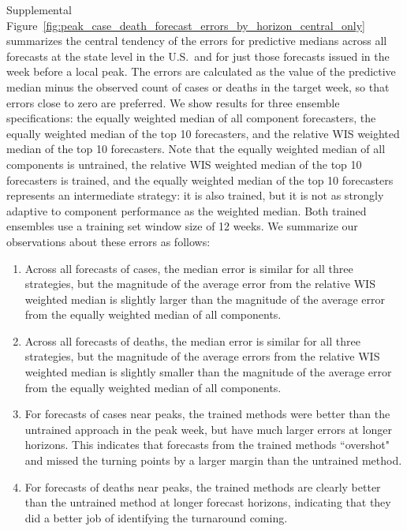 \documentclass{article}
\begin{document}
Supplemental Figure~\ref{fig:peak_case_death_forecast_errors_by_horizon_central_only} summarizes the central tendency of the errors for predictive medians across all forecasts at the state level in the U.S.\ and for just those forecasts issued in the week before a local peak. The errors are calculated as the value of the predictive median minus the observed count of cases or deaths in the target week, so that errors close to zero are preferred. We show results for three ensemble specifications: the equally weighted median of all component forecasters, the equally weighted median of the top 10 forecasters, and the relative WIS weighted median of the top 10 forecasters. Note that the equally weighted median of all components is untrained, the relative WIS weighted median of the top 10 forecasters is trained, and the equally weighted median of the top 10 forecasters represents an intermediate strategy: it is also trained, but it is not as strongly adaptive to component performance as the weighted median. Both trained ensembles use a training set window size of 12 weeks. We summarize our observations about these errors as follows:
\begin{enumerate}
    \item Across all forecasts of cases, the median error is similar for all three strategies, but the magnitude of the average error from the relative WIS weighted median is slightly larger than the magnitude of the average error from the equally weighted median of all components.
    \item Across all forecasts of deaths, the median error is similar for all three strategies, but the magnitude of the average errors from the relative WIS weighted median is slightly smaller than the magnitude of the average error from the equally weighted median of all components.
    \item For forecasts of cases near peaks, the trained methods were better than the untrained approach in the peak week, but have much larger errors at longer horizons. This indicates that forecasts from the trained methods ``overshot" and missed the turning points by a larger margin than the untrained method.
    \item For forecasts of deaths near peaks, the trained methods are clearly better than the untrained method at longer forecast horizons, indicating that they did a better job of identifying the turnaround coming.
\end{enumerate}
\end{document}
